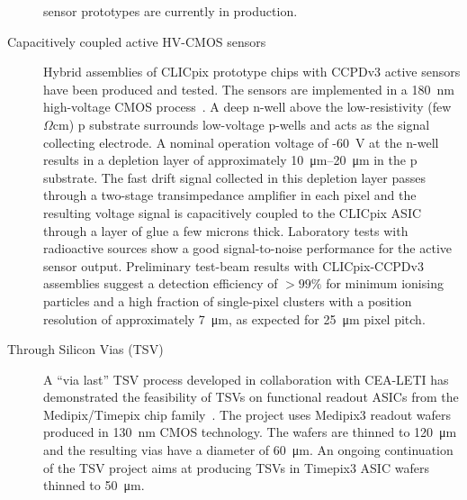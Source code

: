 \begin{description}
sensor prototypes are currently in production.
\item[Capacitively coupled active HV-CMOS sensors]
Hybrid assemblies of CLICpix prototype chips with CCPDv3 active sensors
have been produced and tested.
The sensors are implemented in
a \SI{180}{nm} high-voltage CMOS process~\cite{Peric2013131}. A deep n-well above the low-resistivity
(few $\Omega$cm) p substrate
surrounds low-voltage p-wells and acts as the signal collecting electrode.
A nominal operation voltage of -\SI{60}{V} at the
n-well results in a depletion layer of approximately \SIrange{10}{20}{\micro\meter} in the p substrate.
 The fast drift signal collected in this
depletion layer passes through a two-stage transimpedance
amplifier in each pixel and the resulting voltage signal is capacitively coupled to the CLICpix
ASIC through a layer of glue a few microns thick.
Laboratory tests with radioactive sources show a good signal-to-noise performance for the
active sensor output. Preliminary test-beam results with CLICpix-CCPDv3 assemblies suggest a
detection efficiency of $>99\%$ for minimum ionising particles and a high fraction of
single-pixel clusters with a position resolution of
approximately \SI{7}{\micro\meter}, as expected for \SI{25}{\micro\meter} pixel pitch.
\item[Through Silicon Vias (TSV)]
A ``via last'' TSV process developed in collaboration with
CEA-LETI has demonstrated the feasibility of TSVs on functional
readout ASICs from the Medipix/Timepix chip family~\cite{6575630}.
The project uses Medipix3 readout wafers produced in \SI{130}{nm} CMOS
technology. The wafers are thinned to \SI{120}{\micro\meter} and the resulting vias
have a diameter of \SI{60}{\micro\meter}.
An ongoing  continuation of the TSV project aims at producing
TSVs in Timepix3 ASIC wafers thinned to \SI{50}{\micro\meter}.
\end{description}

